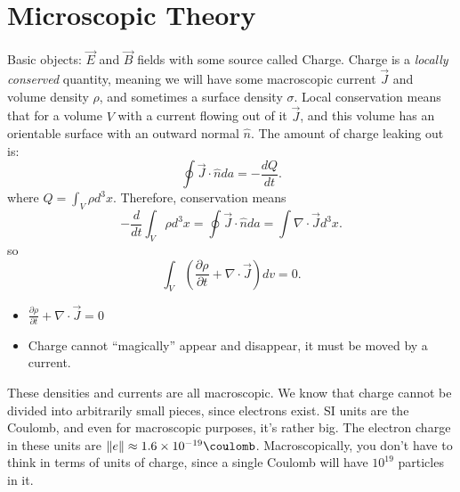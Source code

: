 \documentclass[twoside,master.tex]{subfiles}
\begin{document}

\section{Microscopic Theory}%
\label{sec:microscopic_theory}

Basic objects: $\vec{E}$ and $\vec{B}$ fields with some source called Charge. Charge is a \textit{locally conserved} quantity, meaning we will have some macroscopic current $\vec{J}$ and volume density $\rho$, and sometimes a surface density $\sigma$. Local conservation means that for a volume $V$ with a current flowing out of it $\vec{J}$, and this volume has an orientable surface with an outward normal $\hat{n}$. The amount of charge leaking out is: \[
    \oint \vec{J}\cdot \hat{n} da = - \frac{dQ}{dt}
.\] where $Q = \int_V\rho d^3x$. Therefore, conservation means \[
-\frac{d}{dt}\int_V\rho d^3x = \oint \vec{J}\cdot \hat{n}da = \int\nabla \cdot \vec{J}d^3x
.\] so
\begin{equation}
    \int_V \left( \frac{\partial\rho}{\partial t}+\nabla \cdot \vec{J} \right)dv = 0.
\end{equation}
\begin{itemize}
    \item $\frac{\partial\rho}{\partial t} + \nabla \cdot \vec{J} = 0$
    \item Charge cannot ``magically'' appear and disappear, it must be moved by a current.
\end{itemize}

These densities and currents are all macroscopic. We know that charge cannot be divided into arbitrarily small pieces, since electrons exist. SI units are the Coulomb, and even for macroscopic purposes, it's rather big. The electron charge in these units are $\|e\|\approx 1.6\times 10^{-19}\coulomb$. Macroscopically, you don't have to think in terms of units of charge, since a single Coulomb will have $10^{19}$  particles in it.
\end{document}
